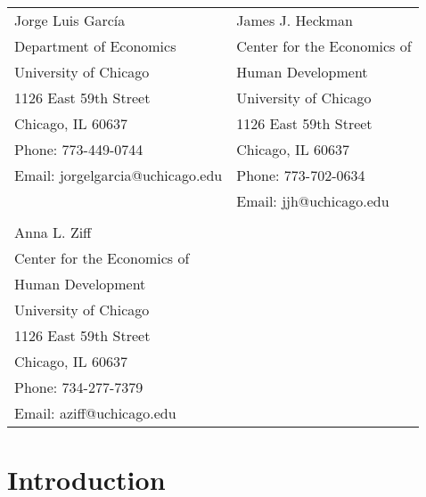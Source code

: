 \bigskip
\begin{tabular}{ll}
Jorge Luis Garc\'{i}a                                       & James J. Heckman \\
Department of Economics                                & Center for the Economics of  \\
University of Chicago                                       & Human Development  \\
1126 East 59th Street                                     & University of Chicago \\
Chicago, IL 60637                                           & 1126 East 59th Street \\
Phone: 773-449-0744                                    & Chicago, IL 60637 \\
Email: jorgelgarcia@uchicago.edu                       & Phone: 773-702-0634  \\
									& Email: jjh@uchicago.edu \\
                                                                       & \\
Anna L. Ziff                                         &  \\
Center for the Economics of & \\
Human Development            & \\
University of Chicago                                        &  \\
1126 East 59th Street                       & \\
Chicago, IL 60637                                              &       \\
Phone: 734-277-7379                                    &  \\
Email: aziff@uchicago.edu                     &  \\

\end{tabular}

\clearpage

\restoregeometry
\doublespacing


\setcounter{page}{0}

\setlength\parindent{0pt}
\setlength{\parskip}{10pt}

\section{Introduction}
\label{sec:introduction}
	

